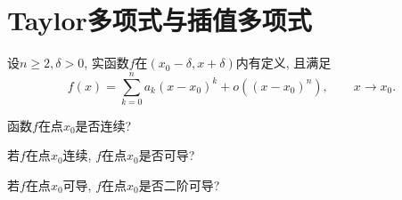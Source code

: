 \section{Taylor多项式与插值多项式}
\begin{quiza}
\woe 设\(n\geqslant 2, \delta>0\), 实函数\(f\)在\((x_0-\delta,x+\delta)\)内有定义, 且满足\[f(x)=\sum_{k=0}^{n}a_k(x-x_0)^k+o\left((x-x_0)^n\right),\qquad x\rightarrow x_0.\]
\begin{quizcs}
\item 函数\(f\)在点\(x_0\)是否连续?
\item  若\(f\)在点\(x_0\)连续, \(f\)在点\(x_0\)是否可导?
\item  若\(f\)在点\(x_0\)可导, \(f\)在点\(x_0\)是否二阶可导?
\end{quizcs}
\begin{solution}


\end{solution}
\end{quiza}
